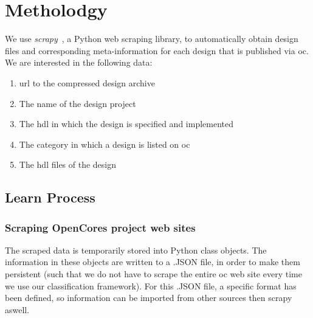 
\section{Metholodgy}

We use \emph{scrapy}~\autocite{Scrapy}, a Python web scraping library, to 
automatically obtain design files and corresponding meta-information for each 
design that is published via \gls{oc}. We are interested in the following data:

\begin{enumerate}

	\item{\Gls{url} to the compressed design archive}

	\item{The name of the design project}

	\item{The \gls{hdl} in which the design is specified and implemented}

	\item{The category in which a design is listed on \gls{oc}}
	
	\item{The \gls{hdl} files of the design}
	
\end{enumerate}

\subsection{Learn Process}

\subsubsection{Scraping OpenCores project web sites} 
The scraped data is temporarily stored into Python class objects. The information 
in these objects are written to a .JSON file, in order to make them persistent (such
that we do not have to scrape the entire \gls{oc} web site every time we use our 
classification framework). For this .JSON file, a specific format has been defined, 
so information can be imported from other sources then scrapy aswell. 

